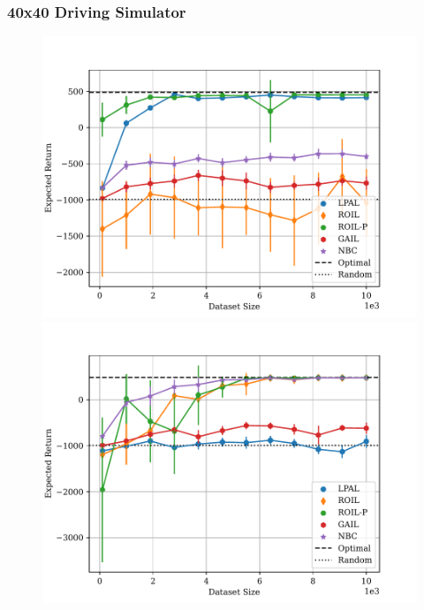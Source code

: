 \documentclass{beamer}
\begin{document}
\begin{frame}
	\frametitle{40x40 Driving Simulator}
\begin{figure}
  \begin{center}
  \begin{minipage}{0.46\linewidth}
    \centering
    \includegraphics[width=\linewidth]{plots/returns/40x40_driving_on_policy_returns.pdf}
  \end{minipage}
  \hspace{0.05\linewidth}
  \begin{minipage}{0.46\linewidth}
    \centering
    \includegraphics[width=\linewidth]{plots/returns/40x40_driving_off_policy_returns.pdf}
  \end{minipage}
  \end{center}
\end{figure}
\end{frame}
\end{document}
